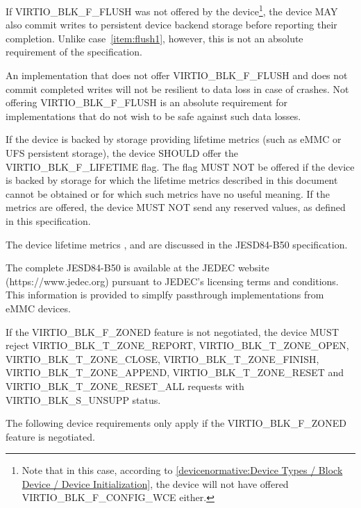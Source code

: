 %

If VIRTIO_BLK_F_FLUSH was not offered by the
  device\footnote{Note that in this case, according to
  \ref{devicenormative:Device Types / Block Device / Device Initialization},
  the device will not have offered VIRTIO_BLK_F_CONFIG_WCE either.}, the
device MAY also commit writes to persistent device backend storage before
reporting their completion.  Unlike case~\ref{item:flush1}, however, this
is not an absolute requirement of the specification.

\begin{note}
  An implementation that does not offer VIRTIO_BLK_F_FLUSH and does not commit
  completed writes will not be resilient to data loss in case of crashes.
  Not offering VIRTIO_BLK_F_FLUSH is an absolute requirement
  for implementations that do not wish to be safe against such data losses.
\end{note}

If the device is backed by storage providing lifetime metrics (such as eMMC
or UFS persistent storage), the device SHOULD offer the VIRTIO_BLK_F_LIFETIME
flag. The flag MUST NOT be offered if the device is backed by storage for which
the lifetime metrics described in this document cannot be obtained or for which
such metrics have no useful meaning. If the metrics are offered, the device MUST NOT
send any reserved values, as defined in this specification.

\begin{note}
  The device lifetime metrics , 
  and  are discussed in the JESD84-B50 specification.

  The complete JESD84-B50 is available at the JEDEC website (https://www.jedec.org)
  pursuant to JEDEC's licensing terms and conditions. This information is provided to
  simplfy passthrough implementations from eMMC devices.
\end{note}

If the VIRTIO_BLK_F_ZONED feature is not negotiated, the device MUST reject
VIRTIO_BLK_T_ZONE_REPORT, VIRTIO_BLK_T_ZONE_OPEN, VIRTIO_BLK_T_ZONE_CLOSE,
VIRTIO_BLK_T_ZONE_FINISH, VIRTIO_BLK_T_ZONE_APPEND, VIRTIO_BLK_T_ZONE_RESET and
VIRTIO_BLK_T_ZONE_RESET_ALL requests with VIRTIO_BLK_S_UNSUPP status.

The following device requirements only apply if the VIRTIO_BLK_F_ZONED feature
is negotiated.

